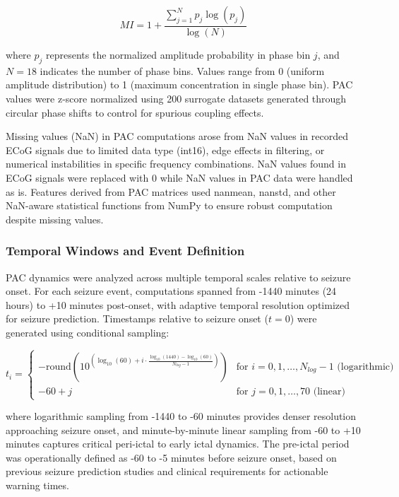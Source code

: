 \begin{equation}
MI = 1 + \frac{\sum_{j=1}^{N} p_j \log(p_j)}{\log(N)}
\end{equation}

where $p_j$ represents the normalized amplitude probability in phase bin $j$, and $N = 18$ indicates the number of phase bins. Values range from 0 (uniform amplitude distribution) to 1 (maximum concentration in single phase bin). PAC values were z-score normalized using 200 surrogate datasets generated through circular phase shifts to control for spurious coupling effects.

	Missing values (NaN) in PAC computations arose from NaN values in recorded ECoG signals due to limited data type (int16), edge effects in filtering, or numerical instabilities in specific frequency combinations. NaN values found in ECoG signals were replaced with 0 while NaN values in PAC data were handled as is. Features derived from PAC matrices used nanmean, nanstd, and other NaN-aware statistical functions from NumPy to ensure robust computation despite missing values.

\subsubsection{Temporal Windows and Event Definition}
PAC dynamics were analyzed across multiple temporal scales relative to seizure onset. For each seizure event, computations spanned from -1440 minutes (24 hours) to +10 minutes post-onset, with adaptive temporal resolution optimized for seizure prediction. Timestamps relative to seizure onset ($t = 0$) were generated using conditional sampling:

\begin{equation}
t_i = \begin{cases}
-\text{round}(10^{(\log_{10}(60) + i \cdot \frac{\log_{10}(1440) - \log_{10}(60)}{N_{log}-1})}) & \text{for } i = 0, 1, \ldots, N_{log}-1 \text{ (logarithmic)} \\
-60 + j & \text{for } j = 0, 1, \ldots, 70 \text{ (linear)}
\end{cases}
\end{equation}

where logarithmic sampling from -1440 to -60 minutes provides denser resolution approaching seizure onset, and minute-by-minute linear sampling from -60 to +10 minutes captures critical peri-ictal to early ictal dynamics. The pre-ictal period was operationally defined as -60 to -5 minutes before seizure onset, based on previous seizure prediction studies  and clinical requirements for actionable warning times.

